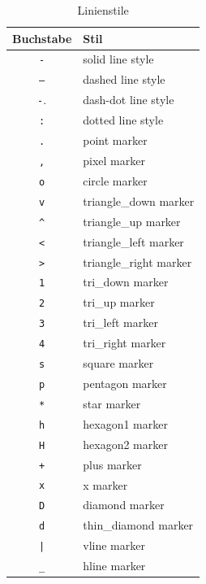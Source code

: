 \begin{table}[H]
  \centering{}
  \caption{Linienstile}
  \label{tab:plt_lines}
  \begin{tabular}{c l}
    \toprule
      Buchstabe & Stil \\
    \midrule
      \texttt{-} & solid line style \\
      \texttt{--} & dashed line style \\
      \texttt{-}. &  dash-dot line style \\
      \texttt{:} & dotted line style \\
      \texttt{.} & point marker \\
      \texttt{,} & pixel marker \\
      \texttt{o} & circle marker \\
      \texttt{v} & triangle\_down marker \\
      \texttt{\^{}} & triangle\_up marker \\
      \texttt{<} & triangle\_left marker \\
      \texttt{>} & triangle\_right marker \\
      \texttt{1} & tri\_down marker \\
      \texttt{2} & tri\_up marker \\
      \texttt{3} & tri\_left marker \\
      \texttt{4} & tri\_right marker \\
      \texttt{s} & square marker \\
      \texttt{p} & pentagon marker \\
      \texttt{*} & star marker \\
      \texttt{h} & hexagon1 marker \\
      \texttt{H} & hexagon2 marker \\
      \texttt{+} & plus marker \\
      \texttt{x} & x marker \\
      \texttt{D} & diamond marker \\
      \texttt{d} & thin\_diamond marker \\
      \texttt{|} & vline marker \\
      \texttt{\_} & hline marker \\
    \bottomrule
  \end{tabular}
\end{table}

